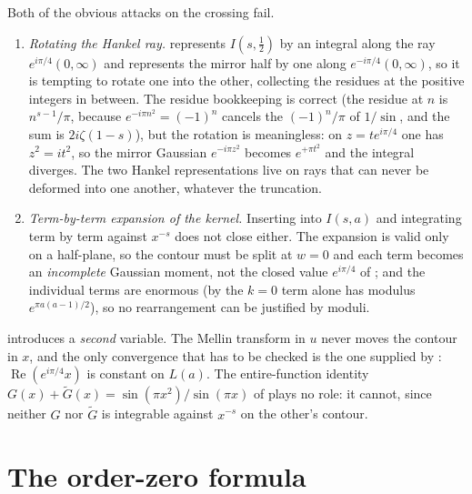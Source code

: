 \begin{remark}
\label{rem:rsz_routes}
Both of the obvious attacks on the crossing fail.
\begin{enumerate}
  \item \emph{Rotating the Hankel ray.}   represents $I(s,\tfrac12)$ by
        an integral along the ray $e^{i\pi/4}(0,\infty)$ and
         represents the mirror half by one along
        $e^{-i\pi/4}(0,\infty)$, so it is tempting to rotate one into the other, collecting
        the residues at the positive integers in between.  The residue bookkeeping is
        correct (the residue at $n$ is $n^{s-1}/\pi$, because $e^{-i\pi n^{2}}=(-1)^{n}$
        cancels the $(-1)^{n}/\pi$ of $1/\sin$, and the sum is $2i\zeta(1-s)$), but the
        rotation is meaningless: on $z=te^{i\pi/4}$ one has $z^{2}=it^{2}$, so the mirror
        Gaussian $e^{-i\pi z^{2}}$ becomes $e^{+\pi t^{2}}$ and the integral diverges.  The two
        Hankel representations
        live on rays that can never be deformed into one another, whatever the truncation.
  \item \emph{Term-by-term expansion of the kernel.}  Inserting  into
        $I(s,a)$ and integrating term by term against $x^{-s}$ does not close either.  The
        expansion is valid only on a half-plane, so the contour must be split at $w=0$ and
        each term becomes an \emph{incomplete} Gaussian moment, not the closed value
        $e^{i\pi/4}$ of ; and the individual terms are enormous
        (by  the $k=0$ term alone has modulus
        $e^{\pi a(a-1)/2}$), so no rearrangement can be justified by moduli.
\end{enumerate}
 introduces a \emph{second} variable.  The
Mellin transform in $u$ never moves the contour in $x$, and the only convergence that has to
be checked is the one supplied by : $\operatorname{Re}(e^{i\pi/4}x)$ is
constant on $L(a)$.  The entire-function identity
$G(x)+\widetilde G(x)=\sin(\pi x^{2})/\sin(\pi x)$ of  plays no role: it
cannot, since neither $G$ nor $\widetilde G$ is integrable against $x^{-s}$ on the other's
contour.
\end{remark}

\section{The order-zero formula}
\label{sec:rsz_formula}

